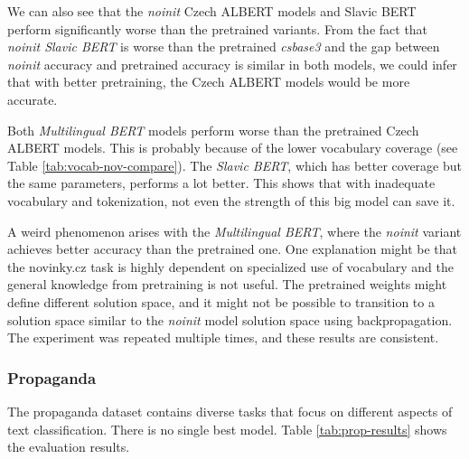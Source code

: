 \documentclass[
  printed, %
  color,   %
  table,   %
  oneside, %
  lof,     %
  lot,     %
]{fithesis3}
\begin{document}
We can also see that the \textit{noinit} Czech ALBERT models and Slavic BERT perform significantly worse than the pretrained variants. 
From the fact that \textit{noinit Slavic BERT} is worse than the pretrained \textit{csbase3} and the gap between \textit{noinit} accuracy and pretrained accuracy is similar in both models, we could infer that with better pretraining, the Czech ALBERT models would be more accurate.

Both \textit{Multilingual BERT} models perform worse than the pretrained Czech ALBERT models. This is probably because of the lower vocabulary coverage (see Table \ref{tab:vocab-nov-compare}). The \textit{Slavic BERT}, which has better coverage but the same parameters, performs a lot better. This shows that with inadequate vocabulary and tokenization, not even the strength of this big model can save it. 

A weird phenomenon arises with the \textit{Multilingual BERT}, where the \textit{noinit} variant achieves better accuracy than the pretrained one. One explanation might be that the novinky.cz task is highly dependent on specialized use of vocabulary and the general knowledge from pretraining is not useful. The pretrained weights might define different solution space, and it might not be possible to transition to a solution space similar to the \textit{noinit} model solution space using backpropagation. The experiment was repeated multiple times, and these results are consistent. 


\subsubsection{Propaganda}

The propaganda dataset contains diverse tasks that focus on different aspects of text classification. There is no single best model. Table \ref{tab:prop-results} shows the evaluation results.
\end{document}
